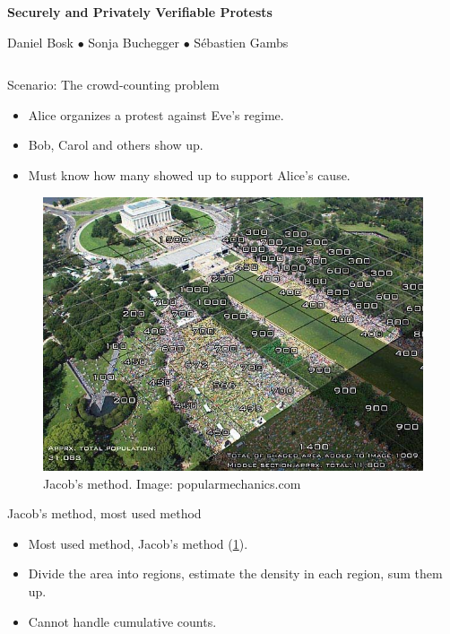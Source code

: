 \begin{center}
  \Huge\bfseries
  Securely and Privately Verifiable Protests
\end{center}
\begin{center}
  \large
  Daniel Bosk $\bullet$ Sonja Buchegger $\bullet$ Sébastien Gambs
\end{center}
\vspace{1.5em}

\begin{columns}[t]

  \begin{column}{0.32\linewidth}

    \begin{blueblock}{Scenario: The crowd-counting problem}
      \begin{itemize}
        \item Alice organizes a protest against Eve's regime.
        \item Bob, Carol and others show up.
        \item Must know how many showed up to support Alice's cause.
      \end{itemize}
    \end{blueblock}

    \begin{figure}
      \centering
      \includegraphics[width=0.9\linewidth]{fig/Jacobs-method.jpg}
      \caption{%
        Jacob's method. Image: popularmechanics.com
      }\label{JacobsMethod}
    \end{figure}

    \begin{whiteblock}{Jacob's method, most used method}
      \begin{itemize}
        \item Most used method, Jacob's method (\cref{JacobsMethod}).
        \item Divide the area into regions, estimate the density in each 
          region, sum them up.
        \item \color{red} Cannot handle cumulative counts.
      \end{itemize}
    \end{whiteblock}


\end{column}
\end{columns}
